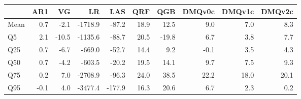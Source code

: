 \begin{tabular}{lrrrrrrrrr}
\toprule
 & AR1 & VG & LR & LAS & QRF & QGB & DMQv0c & DMQv1c & DMQv2c \\
\midrule
Mean & 0.7 & -2.1 & -1718.9 & -87.2 & 18.9 & 12.5 & 9.0 & 7.0 & 8.3 \\
Q5 & 2.1 & -10.5 & -1135.6 & -88.7 & 20.5 & -19.8 & 6.7 & 3.8 & 7.7 \\
Q25 & 0.7 & -6.7 & -669.0 & -52.7 & 14.4 & 9.2 & -0.1 & 3.5 & 4.3 \\
Q50 & 0.7 & -4.2 & -603.5 & -20.2 & 19.5 & 14.1 & 9.7 & 7.5 & 9.3 \\
Q75 & 0.2 & 7.0 & -2708.9 & -96.3 & 24.0 & 38.5 & 22.2 & 18.0 & 20.1 \\
Q95 & -0.1 & 4.0 & -3477.4 & -177.9 & 16.3 & 20.6 & 6.7 & 2.3 & 0.2 \\
\bottomrule
\end{tabular}
